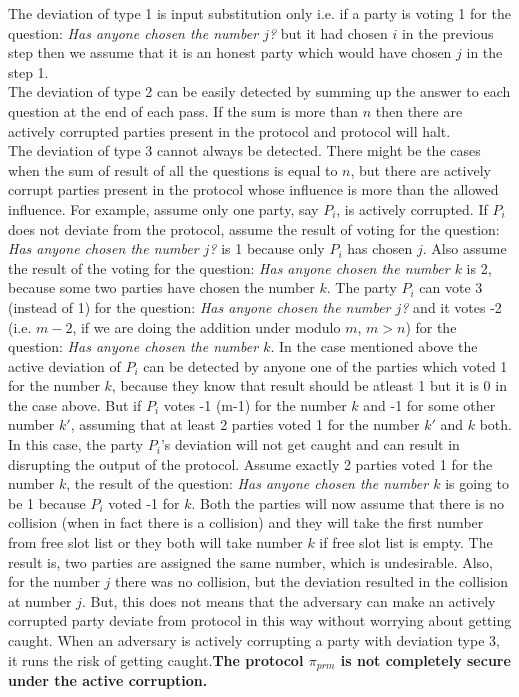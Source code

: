 \documentclass{llncs}
\begin{document}
The deviation of type 1 is input substitution only i.e. if a party is voting 1 for the question: \textit{Has anyone chosen the number $j$?} but it had chosen $i$ in the previous step then we assume that it is an honest party which would have chosen $j$ in the step 1.\\
The deviation of type 2 can be easily detected by summing up the answer to each question at the end of each pass. If the sum is more than $n$ then there are actively corrupted parties present in the protocol and protocol will halt.\\
The deviation of type 3 cannot always be detected. There might be the cases when the sum of result of all the questions is equal to $n$, but there are actively corrupt parties present in the protocol whose influence is more than the allowed influence. For example, assume only one party, say $P_i$, is actively corrupted. If $P_i$ does not deviate from the protocol, assume the result of voting for the question: \textit{Has anyone chosen the number $j$?} is 1 because only $P_i$ has chosen $j$. Also assume the result of the voting for the question: \textit{Has anyone chosen the number $k$} is 2, because some two parties have chosen the number $k$. The party $P_i$ can vote 3 (instead of 1) for the question: \textit{Has anyone chosen the number $j$?} and it votes -2 (i.e. $m-2$, if we are doing the addition under modulo $m$, $m>n$) for the question: \textit{Has anyone chosen the number $k$}. In the case mentioned above the active deviation of $P_i$ can be detected by anyone one of the parties which voted 1 for the number $k$, because they know that result should be atleast 1 but it is 0 in the case above. But if $P_i$ votes -1 (m-1) for the number $k$ and -1 for some other number $k'$, assuming that at least 2 parties voted 1 for the number $k'$ and $k$ both. In this case, the party $P_i$'s deviation will not get caught and can result in disrupting the output of the protocol. Assume exactly 2 parties voted 1 for the number $k$, the result of the question: \textit{Has anyone chosen the number $k$} is going to be 1 because $P_i$ voted -1 for $k$. Both the parties will now assume that there is no collision (when in fact there is a collision) and they will take the first number from free slot list or they both will take number $k$ if free slot list is empty. The result is, two parties are assigned the same number, which is undesirable. Also, for the number $j$ there was no collision, but the deviation resulted in the collision at number $j$. But, this does not means that the adversary can make an actively corrupted party deviate from protocol in this way without worrying about getting caught. When an adversary is actively corrupting a party with deviation type 3, it runs the risk of getting caught.\textbf{The protocol $\pi_{prm}$ is not completely secure under the active corruption.}\\
\end{document}
